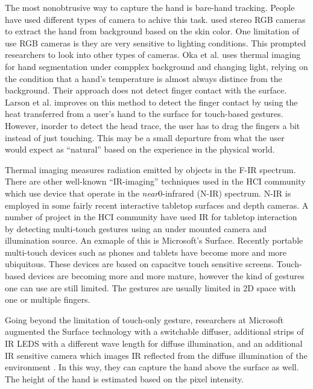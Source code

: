The most nonobtrusive way to capture the hand is bare-hand tracking. People have
used different types of camera to achive this task. \cite{Shin04} used stereo RGB
cameras to extract the hand from background based on the skin color. One
limitation of use RGB cameras is they are very sensitive to lighting conditions.
This prompted researchers to look into other types of cameras. Oka et al. 
\cite{Oka02} uses thermal imaging for hand segmentation under compplex
background and changing light, relying on the condition that a hand's
temperature is almost always distince from the background. Their approach does
not detect finger contact with the surface. Larson et al. \cite{larson11}
improves on this method to detect the finger contact by using
the heat transferred from a user's hand to the surface for touch-based gestures.
However, inorder to detect the head trace, the user has to drag the fingers a
bit instead of just touching. This may be a small departure from what the user
would expect as ``natural'' based on the experience in the physical world.

Thermal imaging measures radiation emitted by objects in the F-IR spectrum.
There are other well-known ``IR-imaging'' techniques used in the HCI community
which use device that operate in the \textit{near}0-infrared (N-IR) spectrum.
N-IR is employed in some fairly recent interactive tabletop surfaces and depth
cameras. A number of project in the HCI community have used IR for tabletop
interaction by detecting multi-touch gestures using an under mounted
camera and illumination source. An exmaple of this is Microsoft's 
Surface\textsuperscript{\textregistered}. Recently portable multi-touch devices
such as phones and tablets have become more and more ubiquitous. These devices
are based on capacitve touch sensitive screens. Touch-based devices are becoming
more and more mature, however the kind of gestures one can use are still
limited. The gestures are usually limited in 2D space with one or multiple
fingers. 

Going beyond the limitation of touch-only gesture, researchers at Microsoft
augmented the Surface technology with a switchable diffuser, additional
strips of IR LEDS with a different wave length for diffuse illumination, and an
additional IR sensitive camera which images IR reflected from the diffuse
illumination of the environment \cite{hilliges09}. In this way, they can capture
the hand above the surface as well. The height of the hand is estimated based on
the pixel intensity.

